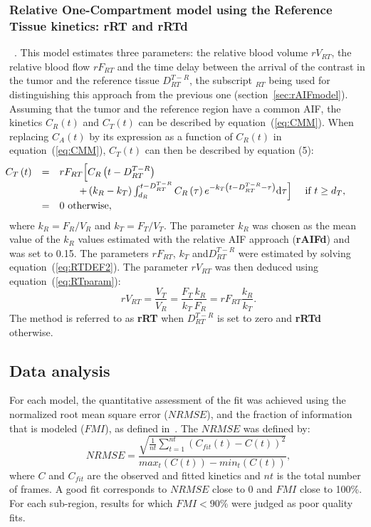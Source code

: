 \subsubsection{Relative One-Compartment model using the Reference Tissue kinetics: \textbf{rRT and rRTd}}~\cite{Patlak1983id,Yankeelov2005de}.
This model estimates three parameters: the relative blood volume $rV_{RT}$, the relative blood flow $rF_{RT}$ and the time delay between the arrival of the contrast in the tumor and the reference tissue $D^{T-R}_{RT}$, the subscript $_{RT}$ being used for distinguishing this approach from the previous one (section~\ref{sec:rAIFmodel}). Assuming that the tumor and the reference region have a common AIF, the kinetics $C_{R}(t)$ and $C_{T}(t)$ can be described by equation~(\ref{eq:CMM}). When replacing $C_A(t)$ by its expression as a function of $C_R(t)$ in equation~(\ref{eq:CMM}), $C_T(t)$  can then be described by equation (5):
\begin{equation}
\begin{array}{rcl}
\hspace{-10mm}
C_T \left( t \right) & = & rF_{RT} \Big[ C_{R} \left( t - D_{RT}^{T-R} \right) \\
& & \qquad + \left( k_{R} - k_T \right) \int_{d_{R}}^{t - D_{RT}^{T-R}} C_{R} \left( \tau \right) e^{- k_T \left( t - D_{RT}^{T-R} - \tau \right)} \mathrm d \tau \Big] \quad \textrm{ if } t \geq d_T, \\
& = & \textrm{0 otherwise,}
\end{array}
\label{eq:RTDEF2}
\end{equation}
where $k_{R} = F_{R}/V_{R}$ and $k_T = F_T/V_T$. The parameter $k_{R}$ was chosen as the mean value of the $k_{R}$ values estimated with the relative AIF approach (\textbf{rAIFd}) and was set to 0.15. The parameters $rF_{RT}$, $k_T$ and$D^{T-R}_{RT}$ were estimated by solving equation~(\ref{eq:RTDEF2}). The parameter $rV_{RT}$ was then deduced using equation~(\ref{eq:RTparam}): 
\begin{equation}
rV_{RT} = \frac{V_T}{V_{R}}  = \frac{F_{T}}{k_{T}} \frac{k_{R}}{F_{R}} = rF_{RT}\frac{k_{R}}{k_T}.
\label{eq:RTparam}
\end{equation}
The method is referred to as \textbf{rRT} when $D^{T-R}_{RT}$ is set to zero and \textbf{rRTd} otherwise. 

\subsection{Data analysis}
For each model, the quantitative assessment of the fit was achieved using the normalized root mean square error ($NRMSE$), and the fraction of information that is modeled  ($FMI$), as defined in~\cite{Balvay2005ca}. The $NRMSE$ was defined by: 
\begin{equation}
NRMSE = \frac{\sqrt{\frac{1}{nt} \sum_{t=1}^{nt}\left(C_{fit}\left(t\right)-C\left(t\right)\right)^2}}{max_t(C(t))-min_t(C(t))},
\end{equation}
where $C$ and $C_{fit}$ are the observed and fitted kinetics and $nt$ is the total number of frames. 
A good fit corresponds to $NRMSE$ close to 0 and $FMI$ close to 100\%.
For each sub-region, results for which $FMI < 90\%$ were judged as poor quality fits.


